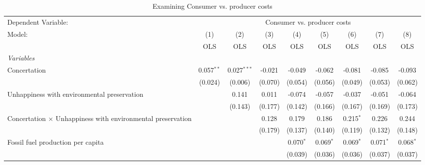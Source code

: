 
\begin{table}[htbp]
   \caption{Examining Consumer vs. producer costs}
   \centering
   \begin{tabular}{lcccccccc}
      \toprule
      Dependent Variable: & \multicolumn{8}{c}{Consumer vs. producer costs}\\
      Model:                                                             & (1)          & (2)           & (3)     & (4)         & (5)         & (6)         & (7)          & (8)\\  
                                                                         &  OLS         & OLS           & OLS     & OLS         & OLS         & OLS         & OLS          & OLS\\  
      \midrule
      \emph{Variables}\\
      Concertation                                                       & 0.057$^{**}$ & 0.027$^{***}$ & -0.021  & -0.049      & -0.062      & -0.081      & -0.085       & -0.093\\   
                                                                         & (0.024)      & (0.006)       & (0.070) & (0.054)     & (0.056)     & (0.049)     & (0.053)      & (0.062)\\   
      Unhappiness with environmental preservation                        &              & 0.141         & 0.011   & -0.074      & -0.057      & -0.037      & -0.051       & -0.064\\   
                                                                         &              & (0.143)       & (0.177) & (0.142)     & (0.166)     & (0.167)     & (0.169)      & (0.173)\\   
      Concertation $\times$ Unhappiness with environmental preservation  &              &               & 0.128   & 0.179       & 0.186       & 0.215$^{*}$ & 0.226        & 0.244\\   
                                                                         &              &               & (0.179) & (0.137)     & (0.140)     & (0.119)     & (0.132)      & (0.148)\\   
      Fossil fuel production per capita                                  &              &               &         & 0.070$^{*}$ & 0.069$^{*}$ & 0.069$^{*}$ & 0.071$^{*}$  & 0.068$^{*}$\\   
                                                                         &              &               &         & (0.039)     & (0.036)     & (0.036)     & (0.037)      & (0.037)\\   

\end{tabular}
\end{table}
